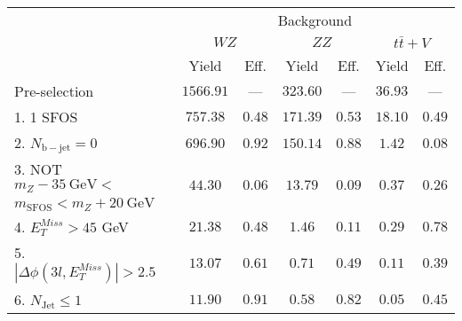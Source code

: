 \begin{tabular}{l||c|c||c|c||c|c}
\hline
 &       \multicolumn{6}{c}{Background}\\
 &  \multicolumn{2}{c||}{$WZ$} & \multicolumn{2}{c||}{$ZZ$} & \multicolumn{2}{c}{$t\bar{t}+V$} \\ 
 & Yield & Eff. & Yield & Eff. & Yield & Eff. \\
\hline\hline
Pre-selection & $1566.91$ & --- &  $323.60$ & --- &  $36.93$ & ---  \\
\hline
1. 1 SFOS &  $757.38$ &  $0.48$ &  $171.39$ &  $0.53$ &  $18.10$ &  $0.49$ \\ 
\hline
2. $N_{\mathrm{b-jet}} = 0$ &  $696.90$ &  $0.92$ &  $150.14$ &  $0.88$ &  $1.42$ &  $0.08$\\ 
\hline
3. NOT $m_Z - 35~\mathrm{GeV} <$  &  \multirow{2}{*}{$44.30$} &  \multirow{2}{*}{$0.06$} &  \multirow{2}{*}{$13.79$} &  \multirow{2}{*}{$0.09$} &  \multirow{2}{*}{$0.37$} &  \multirow{2}{*}{$0.26$} \\ 
\hfill $ m_{\mathrm{SFOS}} < m_Z + 20~\mathrm{GeV}$ & & & &  & & \\
\hline
4. $E_{T}^{Miss} > 45$ GeV &  $21.38$ &  $0.48$ &  $1.46$ &  $0.11$ &  $0.29$ &  $0.78$ \\ 
\hline
5. $|\Delta\phi(3l,E_{T}^{Miss})| > 2.5$ &  $13.07$ &  $0.61$ &  $0.71$ &  $0.49$ &  $0.11$ &  $0.39$ \\ 
\hline
6. $N_{\mathrm{Jet}} \leq 1$ &  $11.90$ &  $0.91$ &  $0.58$ &  $0.82$ &  $0.05$ &  $0.45$ \\ 
\hline
\end{tabular}
